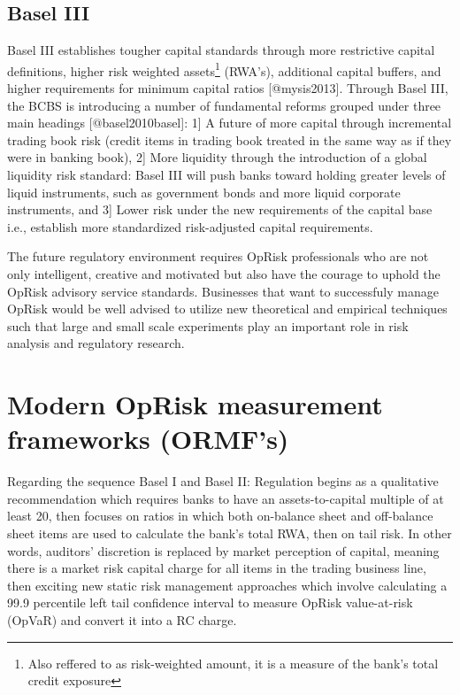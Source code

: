 \documentclass[]{article}
\let\rmarkdownfootnote\footnote%
\def\footnote{\protect\rmarkdownfootnote}
\begin{document}
\subsection{Basel III}

Basel III establishes tougher capital standards through more restrictive
capital definitions, higher risk weighted
assets\footnote{Also reffered to as risk-weighted amount, it is a measure of the bank's total credit exposure}
(RWA's), additional capital buffers, and higher requirements for minimum
capital ratios {[}@mysis2013{]}. Through Basel III, the BCBS is
introducing a number of fundamental reforms grouped under three main
headings {[}@basel2010basel{]}: 1{]} A future of more capital through
incremental trading book risk (credit items in trading book treated in
the same way as if they were in banking book), 2{]} More liquidity
through the introduction of a global liquidity risk standard: Basel III
will push banks toward holding greater levels of liquid instruments,
such as government bonds and more liquid corporate instruments, and 3{]}
Lower risk under the new requirements of the capital base i.e.,
establish more standardized risk-adjusted capital requirements.\medskip

The future regulatory environment requires OpRisk professionals who are
not only intelligent, creative and motivated but also have the courage
to uphold the OpRisk advisory service standards. Businesses that want to
successfuly manage OpRisk would be well advised to utilize new
theoretical and empirical techniques such that large and small scale
experiments play an important role in risk analysis and regulatory
research.

\section{Modern OpRisk measurement frameworks (ORMF's)}
\label{sec:Modern OpRisk measurement frameworks (ORMF's)}

Regarding the sequence Basel I and Basel II: Regulation begins as a
qualitative recommendation which requires banks to have an
assets-to-capital multiple of at least 20, then focuses on ratios in
which both on-balance sheet and off-balance sheet items are used to
calculate the bank's total RWA, then on tail risk. In other words,
auditors' discretion is replaced by market perception of capital,
meaning there is a market risk capital charge for all items in the
trading business line, then exciting new static risk management
approaches which involve calculating a 99.9 percentile left tail
confidence interval to measure OpRisk value-at-risk (OpVaR) and convert
it into a RC charge.\medskip
\end{document}
